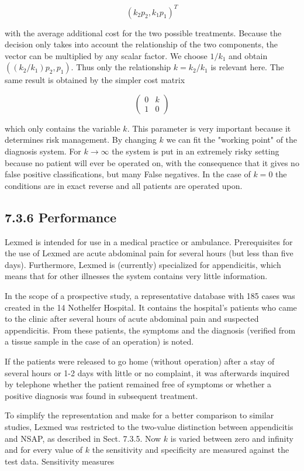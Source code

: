 \documentclass[10pt]{article}
\begin{document}
$$
\left(k_{2} p_{2}, k_{1} p_{1}\right)^{T}
$$

with the average additional cost for the two possible treatments. Because the decision only takes into account the relationship of the two components, the vector can be multiplied by any scalar factor. We choose $1 / k_{1}$ and obtain $\left(\left(k_{2} / k_{1}\right) p_{2}, p_{1}\right)$. Thus only the relationship $k=k_{2} / k_{1}$ is relevant here. The same result is obtained by the simpler cost matrix

$$
\left(\begin{array}{ll}
0 & k \\
1 & 0
\end{array}\right)
$$

which only contains the variable $k$. This parameter is very important because it determines risk management. By changing $k$ we can fit the "working point" of the diagnosis system. For $k \rightarrow \infty$ the system is put in an extremely risky setting because no patient will ever be operated on, with the consequence that it gives no false positive classifications, but many False negatives. In the case of $k=0$ the conditions are in exact reverse and all patients are operated upon.

\subsection*{7.3.6 Performance}
Lexmed is intended for use in a medical practice or ambulance. Prerequisites for the use of Lexmed are acute abdominal pain for several hours (but less than five days). Furthermore, Lexmed is (currently) specialized for appendicitis, which means that for other illnesses the system contains very little information.

In the scope of a prospective study, a representative database with 185 cases was created in the 14 Nothelfer Hospital. It contains the hospital's patients who came to the clinic after several hours of acute abdominal pain and suspected appendicitis. From these patients, the symptoms and the diagnosis (verified from a tissue sample in the case of an operation) is noted.

If the patients were released to go home (without operation) after a stay of several hours or 1-2 days with little or no complaint, it was afterwards inquired by telephone whether the patient remained free of symptoms or whether a positive diagnosis was found in subsequent treatment.

To simplify the representation and make for a better comparison to similar studies, Lexmed was restricted to the two-value distinction between appendicitis and NSAP, as described in Sect. 7.3.5. Now $k$ is varied between zero and infinity\\
and for every value of $k$ the sensitivity and specificity are measured against the test data. Sensitivity measures
\end{document}
